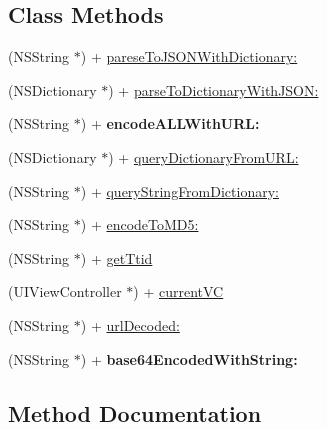 \subsection*{Class Methods}
\begin{DoxyCompactItemize}
\item 
(N\+S\+String $\ast$) + \mbox{\hyperlink{interface_a_l_p_open_util_a85ee488d6a4c77319d66f99ca2792f79}{parese\+To\+J\+S\+O\+N\+With\+Dictionary\+:}}
\item 
(N\+S\+Dictionary $\ast$) + \mbox{\hyperlink{interface_a_l_p_open_util_a4d8d47fd85ecc1cbc65472a93123a925}{parse\+To\+Dictionary\+With\+J\+S\+O\+N\+:}}
\item 
\mbox{\label{interface_a_l_p_open_util_a4d91887971f86a30d5451409742bad8b}} 
(N\+S\+String $\ast$) + {\bfseries encode\+A\+L\+L\+With\+U\+R\+L\+:}
\item 
(N\+S\+Dictionary $\ast$) + \mbox{\hyperlink{interface_a_l_p_open_util_a8d5e6196d040edc82f548ac156d91259}{query\+Dictionary\+From\+U\+R\+L\+:}}
\item 
(N\+S\+String $\ast$) + \mbox{\hyperlink{interface_a_l_p_open_util_a2a05c0902ba02d01d6a35f633e0f46b2}{query\+String\+From\+Dictionary\+:}}
\item 
(N\+S\+String $\ast$) + \mbox{\hyperlink{interface_a_l_p_open_util_a4eb97b8286f0a2acb266c303987ea563}{encode\+To\+M\+D5\+:}}
\item 
(N\+S\+String $\ast$) + \mbox{\hyperlink{interface_a_l_p_open_util_a57e218533dda45bf22c392662edabde8}{get\+Ttid}}
\item 
(U\+I\+View\+Controller $\ast$) + \mbox{\hyperlink{interface_a_l_p_open_util_acf0f830a336b80b2fc30e9d333c8c29c}{current\+VC}}
\item 
(N\+S\+String $\ast$) + \mbox{\hyperlink{interface_a_l_p_open_util_af5a7d624f1f1c4fc03ef437d358d1763}{url\+Decoded\+:}}
\item 
\mbox{\label{interface_a_l_p_open_util_a03f9df1888eaa09e7696d2ffb584344e}} 
(N\+S\+String $\ast$) + {\bfseries base64\+Encoded\+With\+String\+:}
\end{DoxyCompactItemize}


\subsection{Method Documentation}
\mbox{\label{interface_a_l_p_open_util_acf0f830a336b80b2fc30e9d333c8c29c}} 
